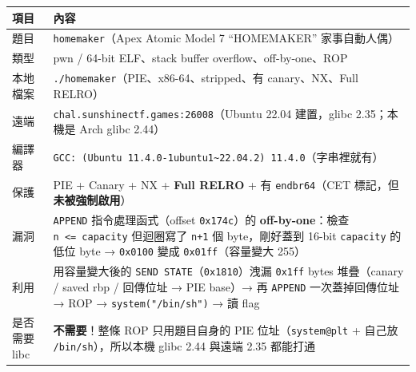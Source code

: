 \documentclass[10pt,a4paper]{article}
\newcounter{none}
\begin{document}
{\def\LTcaptype{none} %
\begin{longtable}[]{@{}
  >{\raggedright\arraybackslash}p{}
  >{\raggedright\arraybackslash}p{}@{}}
\toprule\noalign{}
\begin{minipage}[b]{\linewidth}\raggedright
項目
\end{minipage} & \begin{minipage}[b]{\linewidth}\raggedright
內容
\end{minipage} \\
\midrule\noalign{}
\endhead
\bottomrule\noalign{}
\endlastfoot
題目 & \texttt{homemaker}（Apex Atomic Model 7 ``HOMEMAKER''
家事自動人偶） \\
類型 & pwn / 64-bit ELF、stack buffer overflow、off-by-one、ROP \\
本地檔案 & \texttt{./\allowbreak{}homemaker}（PIE、x86-64、stripped、有
canary、NX、Full RELRO） \\
遠端 & \texttt{chal.\allowbreak{}sunshinectf.\allowbreak{}games:\allowbreak{}26008}（Ubuntu 22.04 建置，glibc
2.35；本機是 Arch glibc 2.44） \\
編譯器 &
\texttt{GCC:\allowbreak{}\ \allowbreak{}(Ubuntu\ \allowbreak{}11.\allowbreak{}4.\allowbreak{}0-\allowbreak{}1ubuntu1\textasciitilde{}\allowbreak{}22.\allowbreak{}04.\allowbreak{}2)\ \allowbreak{}11.\allowbreak{}4.\allowbreak{}0}（字串裡就有） \\
保護 & PIE + Canary + NX + \textbf{Full RELRO} + 有
\texttt{endbr64}（CET 標記，但\textbf{未被強制啟用}） \\
漏洞 & \texttt{APPEND} 指令處理函式（offset \texttt{0x174c}）的
\textbf{off-by-one}：檢查 \texttt{n\ \allowbreak{}\textless{}\allowbreak{}=\ \allowbreak{}capacity} 但迴圈寫了
\texttt{n+1} 個 byte，剛好蓋到 16-bit \texttt{capacity} 的低位 byte →
\texttt{0x0100} 變成 \texttt{0x01ff}（容量變大 255） \\
利用 & 用容量變大後的 \texttt{SEND\ \allowbreak{}STATE}（\texttt{0x1810}）洩漏
\texttt{0x1ff} bytes 堆疊（canary / saved rbp / 回傳位址 → PIE base）→
再 \texttt{APPEND} 一次蓋掉回傳位址 → ROP → \texttt{system("/\allowbreak{}bin/\allowbreak{}sh")} →
讀 flag \\
是否需要 libc & \textbf{不需要}！整條 ROP 只用題目自身的 PIE
位址（\texttt{system@plt} + 自己放 \texttt{/\allowbreak{}bin/\allowbreak{}sh}），所以本機 glibc
2.44 與遠端 2.35 都能打通 \\
\end{longtable}
}
\end{document}
